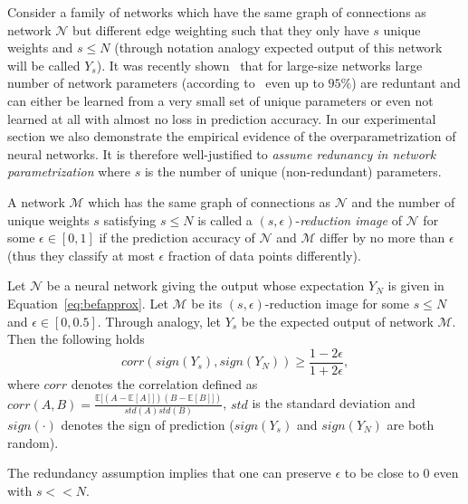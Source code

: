 \documentclass[twoside]{article}
\begin{document}
Consider a family of networks which have the same graph of connections as network $\mathcal{N}$ but different edge weighting such that they only have $s$ unique weights and $s \leq N$ (through notation analogy expected output of this network will be called $Y_s$). It was recently shown~\cite{NIPS2013_5025,DBLP:journals/corr/DentonZBLF14} that for large-size networks large number of network parameters (according to~\cite{NIPS2013_5025} even up to $95\%$) are reduntant and can either be learned from a very small set of unique parameters or even not learned at all with almost no loss in prediction accuracy.  In our experimental section we also demonstrate the empirical evidence of the overparametrization of neural networks. It is therefore well-justified to \textit{assume redunancy in network parametrization} where $s$ is the number of unique (non-redundant) parameters.

\begin{definition}
A network $\mathcal{M}$ which has the same graph of connections as $\mathcal{N}$ and the number of unique weights $s$ satisfying $s \leq N$ is called a $(s,\epsilon)$-\textit{reduction image} of $\mathcal{N}$ for some $\epsilon \in [0,1]$ if the prediction accuracy of $\mathcal{N}$ and $\mathcal{M}$ differ by no more than $\epsilon$ (thus they classify at most $\epsilon$ fraction of data points differently).
\end{definition}

\begin{theorem}
Let $\mathcal{N}$ be a neural network giving the output whose expectation $Y_N$ is given in Equation~\ref{eq:befapprox}. Let $\mathcal{M}$ be its $(s,\epsilon)$-reduction image for some $s \leq N$ and $\epsilon \in [0,0.5]$. Through analogy, let $Y_s$ be the expected output of network $\mathcal{M}$. Then the following holds
\[corr(sign(Y_s),sign(Y_N)) \geq \frac{1-2\epsilon}{1+2\epsilon},
\]
where $corr$ denotes the correlation defined as $corr(A,B) = \frac{\mathbb{E}[(A - \mathbb{E}[A]])(B - \mathbb{E}[B]])}{std(A)std(B)}$, $std$ is the standard deviation and $sign(\cdot)$ denotes the sign of prediction ($sign(Y_s)$ and $sign(Y_N)$ are both random).
\label{thm:redun}
\end{theorem}

The redundancy assumption implies that one can preserve $\epsilon$ to be close to $0$ even with $s << N$.
\end{document}
